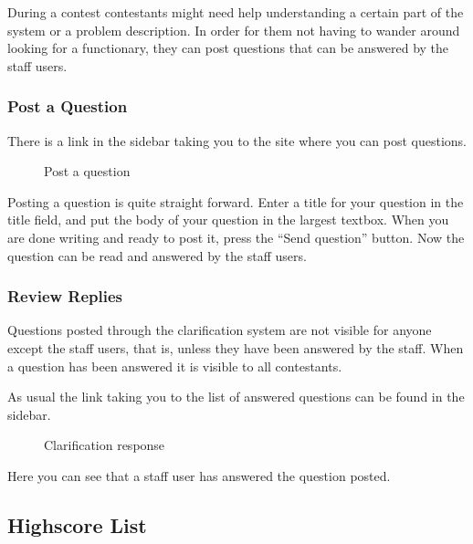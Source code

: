 During a contest contestants might need help understanding a certain
part of the system or a problem description. In order for them not
having to wander around looking for a functionary, they can post
questions that can be answered by the staff users. 

\subsubsection{Post a Question}

There is a link in the sidebar taking you to the site where you can post
questions. 

\begin{figure}
\centering
 \caption{Post a question}
 \label{fig:clarificationQuestion}
\end{figure}

Posting a question is quite straight forward. Enter a title for your
question in the title field, and put the body of your question in the
largest textbox. When you are done writing and ready to post it, press
the {\textquotedblleft}Send question{\textquotedblright} button. Now
the question can be read and answered by the staff users. 

\subsubsection{Review Replies}

Questions posted through the clarification system are not visible for
anyone except the staff users, that is, unless they have been answered
by the staff. When a question has been answered it is visible to all
contestants.


\bigskip

As usual the link taking you to the list of answered questions can be
found in the sidebar. 

\begin{figure}
\centering
 \caption{Clarification response}
 \label{fig:clarificationResponse}
\end{figure}

Here you can see that a staff user has answered the question posted. 



\subsection{Highscore List}

